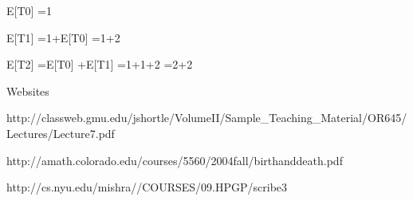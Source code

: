 E[T0] =1

E[T1] =1+E[T0] =1+2  

E[T2] =E[T0] +E[T1] =1+1+2 =2+2  

Websites

http://classweb.gmu.edu/jshortle/VolumeII/Sample_Teaching_Material/OR645/Lectures/Lecture7.pdf

http://amath.colorado.edu/courses/5560/2004fall/birthanddeath.pdf

http://cs.nyu.edu/mishra//COURSES/09.HPGP/scribe3
